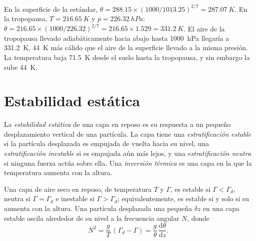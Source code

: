 \begin{example}\label{ex:b1:fluid-envelopes-structure:tropopause}
En la superficie de la estándar, $\theta = 288.15 \times (1000/1013.25)^{2/7} =
\qty{287.07}{K}$. En la tropopausa, $T = \qty{216.65}{K}$ y $p =
\qty{226.32}{hPa}$: $\theta = 216.65 \times (1000/226.32)^{2/7} = 216.65 \times
1.529 = \qty{331.2}{K}$. El aire de la tropopausa llevado adiabáticamente hacia abajo hasta
\qty{1000}{hPa} llegaría a \qty{331.2}{K}, \qty{44}{K} más cálido que el aire de la superficie llevado a la misma presión. La temperatura baja \qty{71.5}{K} desde el suelo hasta la tropopausa, y sin embargo la  sube \qty{44}{K}.
\end{example}

\section{Estabilidad estática}\label{sec:b1:fluid-envelopes-structure:stability}

\begin{definition}\label{def:b1:fluid-envelopes-structure:stability}
La \emph{estabilidad estática} de una capa en reposo es su respuesta a un pequeño desplazamiento vertical de una partícula. La capa tiene una
\emph{estratificación estable} si la partícula desplazada es empujada de vuelta hacia su nivel, una \emph{estratificación
inestable} si es empujada aún más lejos, y una \emph{estratificación neutra} si ninguna fuerza actúa sobre ella. Una \emph{inversión térmica} es una capa en la que la temperatura aumenta con la altura.
\end{definition}

\begin{theorem}\label{thm:b1:fluid-envelopes-structure:stability}
Una capa de aire seco en reposo, de temperatura $T$ y 
$\Gamma$, es estable si $\Gamma < \Gamma_d$, neutra si $\Gamma = \Gamma_d$ e
inestable si $\Gamma > \Gamma_d$; equivalentemente, es estable si y solo si su  aumenta con la altura. Una partícula desplazada una pequeña
$\delta z$ en una capa estable oscila alrededor de su nivel a la frecuencia angular $N$, donde
\[
  N^2 = \frac{g}{T}\,(\Gamma_d - \Gamma) = \frac{g}{\theta}\,\frac{\mathrm d\theta}{\mathrm dz}.
\]
\end{theorem}

